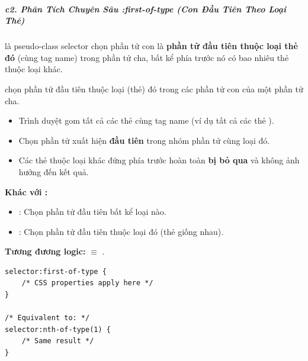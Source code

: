 
\subparagraph{c2. Phân Tích Chuyên Sâu :first-of-type (Con Đầu Tiên Theo Loại Thẻ)}

 là pseudo-class selector chọn phần tử con là \textbf{phần tử đầu tiên thuộc loại thẻ đó} (cùng tag name) trong phần tử cha, bất kể phía trước nó có bao nhiêu thẻ thuộc loại khác.

\begin{conceptBox}
 chọn phần tử đầu tiên thuộc loại (thẻ) đó trong các phần tử con của một phần tử cha.
\begin{itemize}[leftmargin=1.5em, itemsep=2pt, parsep=0pt]
    \item Trình duyệt gom tất cả các thẻ cùng tag name (ví dụ tất cả các thẻ ).
    \item Chọn phần tử xuất hiện \textbf{đầu tiên} trong nhóm phần tử cùng loại đó.
    \item Các thẻ thuộc loại khác đứng phía trước hoàn toàn \textbf{bị bỏ qua} và không ảnh hưởng đến kết quả.
\end{itemize}
\par\vspace{4pt}
\textbf{Khác với :}
\begin{itemize}[leftmargin=1.5em, itemsep=2pt, parsep=0pt]
    \item {}: Chọn phần tử đầu tiên bất kể loại nào.
    \item {}: Chọn phần tử đầu tiên thuộc loại đó (thẻ giống nhau).
\end{itemize}
\par\vspace{4pt}
\textbf{Tương đương logic:}  $\equiv$ .
\end{conceptBox}

\begin{codeWindow}
\begin{lstlisting}[language=CSS3]
selector:first-of-type {
    /* CSS properties apply here */
}

/* Equivalent to: */
selector:nth-of-type(1) {
    /* Same result */
}
\end{lstlisting}
\end{codeWindow}

